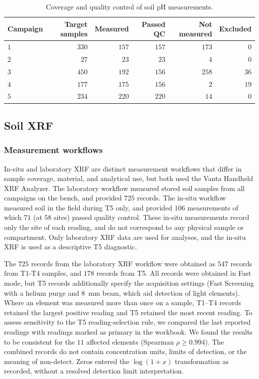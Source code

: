 \documentclass[11pt]{article}
\begin{document}
\begin{table}[H]\centering\small
\caption{Coverage and quality control of soil pH measurements.}
\label{tab:ph-coverage}
\begin{tabular}{lrrrrr}
\toprule
Campaign & Target samples & Measured & Passed QC & Not measured & Excluded \\
\midrule
$1$ & $330$ & $157$ & $157$ & $173$ & $0$ \\
$2$ & $27$ & $23$ & $23$ & $4$ & $0$ \\
$3$ & $450$ & $192$ & $156$ & $258$ & $36$ \\
$4$ & $177$ & $175$ & $156$ & $2$ & $19$ \\
$5$ & $234$ & $220$ & $220$ & $14$ & $0$ \\
\bottomrule
\end{tabular}
\end{table}

\subsection{Soil XRF}
\label{sup:XRF}
\subsubsection{Measurement workflows}
In-situ and laboratory XRF are distinct measurement workflows that differ in sample coverage, material, and analytical use, but both used the Vanta Handheld XRF Analyzer. The laboratory workflow measured stored soil samples from all campaigns on the bench, and provided $725$ records. The in-situ workflow measured soil in the field during T5 only, and provided $106$ measurements of which $71$ (at $58$ sites) passed quality control. These in-situ measurements record only the site of each reading, and do not correspond to any physical sample or compartment. Only laboratory XRF data are used for analyses, and the in-situ XRF is used as a descriptive T5 diagnostic.

The $725$ records from the laboratory XRF workflow were obtained as $547$ records from T1-T4 samples, and $178$ records from T5. All records were obtained in Fast mode, but T5 records additionally specify the acquisition settings (Fast Screening with a helium purge and $8$~mm beam, which aid detection of light elements). Where an element was measured more than once on a sample, T1–T4 records retained the largest positive reading and T5 retained the most recent reading. To assess sensitivity to the T5 reading-selection rule, we compared the last reported readings with readings marked as primary in the workbook. We found the results to be consistent for the $11$ affected elements (Spearman $\rho \geq 0.994$). The combined records do not contain concentration units, limits of detection, or the meaning of non-detect. Zeros entered the $\log(1+x)$ transformation as recorded, without a resolved detection limit interpretation.
\end{document}
